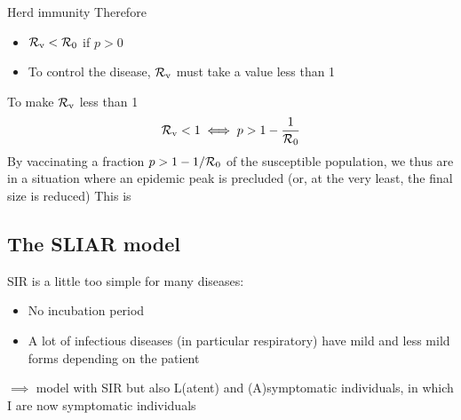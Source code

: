 \documentclass[aspectratio=169]{beamer}\usepackage[]{graphicx}\usepackage[]{xcolor}
\begin{document}
\begin{frame}{Herd immunity}
  Therefore
  \begin{itemize}
    \item $\mathcal{R}_{\text{v}}<\mathcal{R}_0$ if $p>0$ 
    \item To control the disease, $\mathcal{R}_{\text{v}}$ must take a value less than 1
  \end{itemize}
  \vfill
To make $\mathcal{R}_{\text{v}}$ less than 1
  \begin{equation}\label{eq:herd_immunity}
    \mathcal{R}_{\text{v}}<1 \iff p> 1-\frac{1}{\mathcal{R}_0}
  \end{equation}
  \vfill
  By vaccinating a fraction $p>1-1/\mathcal{R}_0$ of the susceptible population, we thus are in a situation where an epidemic peak is precluded (or, at the very least, the final size is reduced)
  \vfill
  This is 
\end{frame}


\subsection{The SLIAR model}


\begin{frame}
SIR is a little too simple for many diseases:
\vfill
\begin{itemize}
\item No incubation period
\vfill
\item A lot of infectious diseases (in particular respiratory) have mild and less mild forms depending on the patient
\end{itemize}
\vfill
$\implies$ model with SIR but also L(atent) and (A)symptomatic individuals, in which I are now symptomatic individuals
\end{frame}
\end{document}
